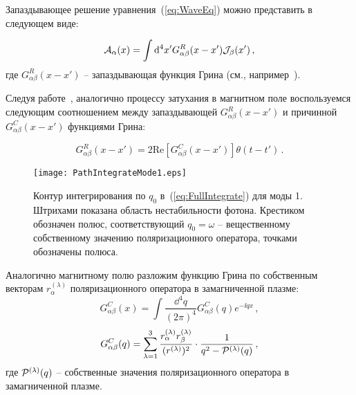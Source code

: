 
Запаздывающее решение уравнения~(\ref{eq:WaveEq}) можно представить в следующем виде:

\begin{equation}\label{eq:RetSol}
	{\cal A}_\alpha(x)=\int \mathrm{d}^4 x' G^R_{\alpha \beta}(x-x'){\cal J}_\beta(x')\, ,
\end{equation}
где $G^R_{\alpha \beta}(x-x')$ -- запаздывающая функция Грина (см., например~\cite{Landau:2001}).

Следуя работе~\cite{MikhChist:2001}, аналогично процессу затухания в магнитном поле воспользуемся следующим соотношением между запаздывающей $G^R_{\alpha\beta}(x-x')$ и причинной $G^C_{\alpha\beta}(x-x')$ функциями Грина:

\begin{equation}\label{eq:RetCasualGreen}
G^R_{\alpha\beta}(x-x')= 2 \mathrm{Re} \left[G^C_{\alpha\beta}(x-x')\right]\theta(t-t')\, .
\end{equation}

\begin{center}
	\begin{figure}[t!]\centering
		\texttt{[image: PathIntegrateMode1.eps]}
		\caption{Контур интегрирования по $q_0$ в~(\ref{eq:FullIntegrate}) для моды 1. Штрихами показана область нестабильности фотона. Крестиком обозначен полюс, соответствующий $q_0=\omega$ -- вещественному собственному значению поляризационного оператора, точками обозначены полюса.} \label{fig:FullPathIntegrMode1}
	\end{figure}
\end{center}

Аналогично магнитному полю разложим функцию Грина по собственным векторам $r_\alpha^{(\lambda)}$ поляризационного оператора в замагниченной плазме:
\begin{equation}\label{eq:InvGcFourier}
	G^C_{\alpha\beta}(x)=\int \frac{\dd^4q}{(2\pi)^4}G^C_{\alpha \beta}(q) e^{-\ii qx}\, ,
\end{equation}
\begin{equation}\label{eq:GcFourier}
	G^C_{\alpha\beta}(q)=\sum_{\lambda=1}^{3}\frac{r_\alpha^{(\lambda)}r^{(\lambda)}_\beta}{(r^{(\lambda)})^2}\cdot \frac{1}{q^2-{\cal P}^{(\lambda)}(q)}\, ,
\end{equation}
где ${\cal P}^{(\lambda)}(q)$ -- собственные значения поляризационного оператора в замагниченной плазме.

